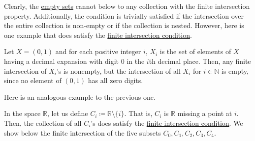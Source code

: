  Clearly, the \hyperref[st-def:empty-set]{empty sets} cannot below to any collection with the finite intersection property. Additionally, the condition is trivially satisfied if the intersection over the entire collection is non-empty or if the collection is nested. However, here is one example that does satisfy the \hyperref[def:finite-intersection-condition]{finite intersection condition}. 

  \begin{example}
    \label{ex:nested-sets-with-empty-intersection-in-01}
    Let $X = (0,1)$ and for each positive integer $i$, $X_i$ is the set of elements of $X$ having a decimal expansion with digit $0$ in the $i$th decimal place. Then, any finite intersection of $X_i$'s is nonempty, but the intersection of all $X_i$ for $i \in \mathbb{N}$ is empty, since no element of $(0,1)$ has all zero digits. 
  \end{example}

  Here is an analogous example to the previous one. 

  \begin{example}
    \label{ex:nested-closed-sets-with-empty-intersection-in-r}
    In the space $\mathbb{R}$, let us define $C_i \coloneqq \mathbb{R} \setminus \{i\}$. That is, $C_i$ is $\mathbb{R}$ missing a point at $i$. Then, the collection of all $C_i$'s does satisfy the \hyperref[def:finite-intersection-condition]{finite intersection condition}. We show below the finite intersection of the five subsets $C_0, C_1, C_2, C_3, C_4$. 

    \begin{figure}[H]
      \centering 
      \label{fig:ex}
    \end{figure}
  \end{example}

